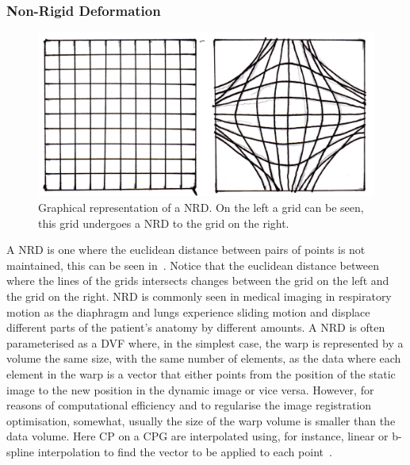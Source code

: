             \subsubsection{Non-Rigid Deformation} \label{sec:non_rigid_deformation}
                \begin{figure}
                    \centering
                    
                    \includegraphics[width=1.0\linewidth]{figures/background_nrd.png}
                    
                    \captionsetup{singlelinecheck=false, justification=raggedright}
                    \caption{Graphical representation of a \gls{NRD}. On the left a grid can be seen, this grid undergoes a \gls{NRD} to the grid on the right.} \label{fig:non_rigid_deformation_nrd}
                \end{figure}
                
                A \gls{NRD} is one where the euclidean distance between pairs of points is not maintained, this can be seen in~. Notice that the euclidean distance between where the lines of the grids intersects changes between the grid on the left and the grid on the right. %
                \gls{NRD} is commonly seen in medical imaging in respiratory motion as the diaphragm and lungs experience sliding motion and displace different parts of the patient's anatomy by different amounts. A \gls{NRD} is often parameterised as a \gls{DVF} where, in the simplest case, the warp is represented by a volume the same size, with the same number of elements, as the data where each element in the warp is a vector that either points from the position of the static image to the new position in the dynamic image or vice versa. However, for reasons of computational efficiency and to regularise the image registration optimisation, somewhat, usually the size of the warp volume is smaller than the data volume. Here \gls{CP} on a \gls{CPG} are interpolated using, for instance, linear or b-spline interpolation to find the vector to be applied to each point~.
                
